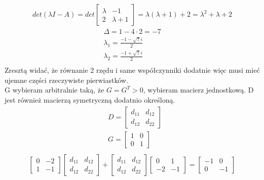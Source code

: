 \documentclass[a4paper,11pt]{article}
\begin{document}
\begin{align*}
det( \lambda I - A ) = det
\begin{bmatrix}
\lambda & -1 \\
2 & \lambda + 1
\end{bmatrix} = 
\lambda( \lambda+1) + 2 = \lambda^{2} + \lambda + 2 
\end{align*}
\begin{align*}
\Delta = 1-4 \cdot 2 = -7 \\
\lambda_{1} = \frac{-1-\sqrt{7}i}{2} \\
\lambda_{2} = \frac{-1+\sqrt{7}i}{2} \\
\end{align*}
Zresztą widać, że równanie 2 rzędu i same współczynniki dodatnie więc musi mieć ujemne części rzeczywiste pierwiastków. \\
G wybieram arbitralnie taką, że \( G = G^{T} > 0 \), wybieram macierz jednostkową. D jest również macierzą symetryczną dodatnio określoną. \\
\begin{align*}
& D = 
\begin{bmatrix}
d_{11} & d_{12} \\
d_{12} & d_{22}
\end{bmatrix} \\
& G = 
\begin{bmatrix}
1 & 0 \\
0 & 1
\end{bmatrix} \\
\end{align*} 
\begin{align*}
\begin{bmatrix}
0 & -2 \\ 
1 & -1
\end{bmatrix}
\begin{bmatrix}
d_{11} & d_{12} \\
d_{12} & d_{22}
\end{bmatrix} 
+
\begin{bmatrix}
d_{11} & d_{12} \\
d_{12} & d_{22}
\end{bmatrix} 
\begin{bmatrix}
0 & 1 \\
-2 & -1
\end{bmatrix}
=
\begin{bmatrix}
-1 & 0 \\
0 & -1
\end{bmatrix}
\end{align*}
\end{document}
